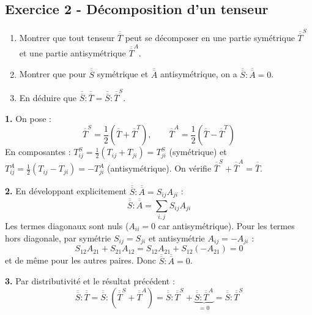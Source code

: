 \documentclass[12pt,a4paper]{article}
\begin{document}
\subsection*{Exercice 2 - Décomposition d'un tenseur \niveau{\facile}}

\begin{boiteexercice}
\begin{enumerate}
  \item Montrer que tout tenseur $\overline{\overline{T}}$ peut se décomposer en une partie symétrique $\overline{\overline{T}}^S$ et une partie antisymétrique $\overline{\overline{T}}^A$.
  \item Montrer que pour $\overline{\overline{S}}$ symétrique et $\overline{\overline{A}}$ antisymétrique, on a $\overline{\overline{S}}:\overline{\overline{A}} = 0$.
  \item En déduire que $\overline{\overline{S}}:\overline{\overline{T}} = \overline{\overline{S}}:\overline{\overline{T}}^S$.
\end{enumerate}
\end{boiteexercice}

\begin{boitecorrige}
\textbf{1.} On pose :
\[
\overline{\overline{T}}^S = \frac{1}{2}(\overline{\overline{T}}+\overline{\overline{T}}^T), \qquad \overline{\overline{T}}^A = \frac{1}{2}(\overline{\overline{T}}-\overline{\overline{T}}^T)
\]
En composantes : $T^S_{ij} = \frac{1}{2}(T_{ij}+T_{ji}) = T^S_{ji}$ (symétrique) et $T^A_{ij} = \frac{1}{2}(T_{ij}-T_{ji}) = -T^A_{ji}$ (antisymétrique). On vérifie $\overline{\overline{T}}^S + \overline{\overline{T}}^A = \overline{\overline{T}}$.

\textbf{2.} En développant explicitement $\overline{\overline{S}}:\overline{\overline{A}} = S_{ij}A_{ji}$ :
\[
\overline{\overline{S}}:\overline{\overline{A}} = \sum_{i,j} S_{ij}A_{ji}
\]
Les termes diagonaux sont nuls ($A_{ii}=0$ car antisymétrique). Pour les termes hors diagonale, par symétrie $S_{ij}=S_{ji}$ et antisymétrie $A_{ij}=-A_{ji}$ :
\[
S_{12}A_{21} + S_{21}A_{12} = S_{12}A_{21} + S_{12}(-A_{21}) = 0
\]
et de même pour les autres paires. Donc $\overline{\overline{S}}:\overline{\overline{A}} = 0$.

\textbf{3.} Par distributivité et le résultat précédent :
\[
\overline{\overline{S}}:\overline{\overline{T}} = \overline{\overline{S}}:(\overline{\overline{T}}^S + \overline{\overline{T}}^A) = \overline{\overline{S}}:\overline{\overline{T}}^S + \underbrace{\overline{\overline{S}}:\overline{\overline{T}}^A}_{=0} = \overline{\overline{S}}:\overline{\overline{T}}^S
\]
\end{boitecorrige}
\end{document}
